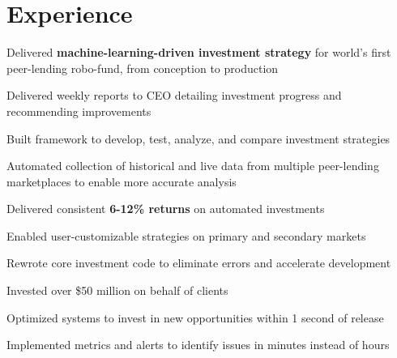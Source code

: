 \documentclass[]{resume}
\begin{document}
\begin{minipage}[t]{0.66\textwidth}



\section{Experience}

\vspace{\topsep} %
\begin{tightemize}
\item Delivered \textbf{machine-learning-driven investment strategy} for world's first peer-lending robo-fund, from conception to production
\item Delivered weekly reports to CEO detailing investment progress and recommending improvements
\item Built framework to develop, test, analyze, and compare investment strategies
\item Automated collection of historical and live data from multiple peer-lending marketplaces to enable more accurate analysis
\item Delivered consistent \textbf{6-12\% returns} on automated investments
\item Enabled user-customizable strategies on primary and secondary markets
\item Rewrote core investment code to eliminate errors and accelerate development
\item Invested over \$50 million on behalf of clients
\item Optimized systems to invest in new opportunities within 1 second of release
\item Implemented metrics and alerts to identify issues in minutes instead of hours
\end{tightemize}
\sectionsep


\end{minipage}
\end{document}
